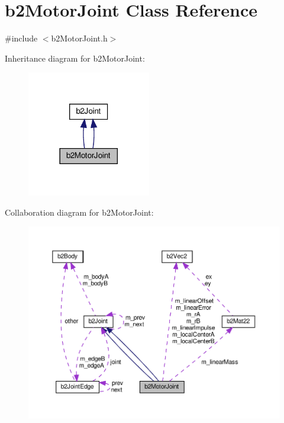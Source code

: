 \hypertarget{classb2MotorJoint}{}\section{b2\+Motor\+Joint Class Reference}
\label{classb2MotorJoint}


{\ttfamily \#include $<$b2\+Motor\+Joint.\+h$>$}



Inheritance diagram for b2\+Motor\+Joint\+:
\nopagebreak
\begin{figure}[H]
\begin{center}
\leavevmode
\includegraphics[width=153pt]{classb2MotorJoint__inherit__graph}
\end{center}
\end{figure}


Collaboration diagram for b2\+Motor\+Joint\+:
\nopagebreak
\begin{figure}[H]
\begin{center}
\leavevmode
\includegraphics[width=350pt]{classb2MotorJoint__coll__graph}
\end{center}
\end{figure}
